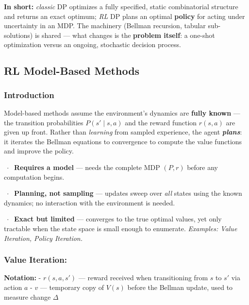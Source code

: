 \documentclass[11pt]{article}
\begin{document}
\textbf{In short:} \emph{classic} DP optimizes a fully specified, static
combinatorial structure and returns an exact optimum; \emph{RL} DP plans
an optimal \textbf{policy} for acting under uncertainty in an MDP. The
machinery (Bellman recursion, tabular sub-solutions) is shared --- what
changes is the \textbf{problem itself}: a one-shot optimization versus
an ongoing, stochastic decision process.

    \clearpage

\subsection{RL Model-Based Methods}\label{rl-model-based-methods}

    \label{model-based-intro}

    \subsubsection{Introduction}\label{introduction}

Model-based methods assume the environment's dynamics are \textbf{fully
known} --- the transition probabilities \(P(s' \mid s, a)\) and the
reward function \(r(s, a)\) are given up front. Rather than
\emph{learning} from sampled experience, the agent
\textbf{\emph{plans}}: it iterates the Bellman equations to convergence
to compute the value functions and improve the policy.

\(\;\cdot\;\) \textbf{Requires a model} --- needs the complete MDP
\((P, r)\) before any computation begins.

\(\;\cdot\;\) \textbf{Planning, not sampling} --- updates sweep over
\emph{all} states using the known dynamics; no interaction with the
environment is needed.

\(\;\cdot\;\) \textbf{Exact but limited} --- converges to the true
optimal values, yet only tractable when the state space is small enough
to enumerate. \emph{Examples: Value Iteration, Policy Iteration.}

    \clearpage

\label{value-iteration-algo}

    \subsubsection{Value Iteration:}\label{value-iteration}

    \textbf{Notation:} - \(r(s,a,s')\) --- reward received when
transitioning from \(s\) to \(s'\) via action \(a\) - \(v\) ---
temporary copy of \(V(s)\) before the Bellman update, used to measure
change \(\Delta\)
\end{document}
